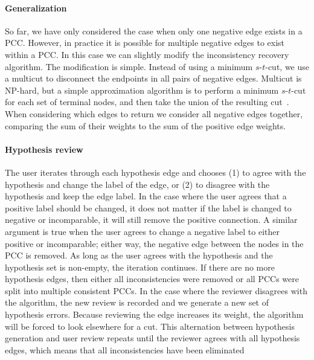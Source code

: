 \paragraph{Generalization}
So far, we have only considered the case when only one negative edge exists in a PCC.
However, in practice it is possible for multiple negative edges to exist within a PCC.
In this case we can slightly modify the inconsistency recovery algorithm.
The modification is simple.
Instead of using a minimum $s$-$t$-cut, we use a multicut to disconnect the endpoints in all pairs of negative
  edges.
Multicut is NP-hard, but a simple approximation algorithm is to perform a minimum $s$-$t$-cut for each set of
  terminal nodes, and then take the union of the resulting cut~\cite[203--208]{vazirani_approximation_2013}.
When considering which edges to return we consider all negative edges together, comparing the sum of their
  weights to the sum of the positive edge weights.

\paragraph{Hypothesis review}
The user iterates through each hypothesis edge and chooses
(1) to agree with the hypothesis and change the label of the edge, or
(2) to disagree with the hypothesis and keep the edge label.
In the case where the user agrees that a positive label should be changed, it does not matter if the label is
  changed to negative or incomparable, it will still remove the positive connection.
A similar argument is true when the user agrees to change a negative label to either positive or incomparable;
  either way, the negative edge between the nodes in the PCC is removed.
As long as the user agrees with the hypothesis and the hypothesis set is non-empty, the iteration continues.
If there are no more hypothesis edges, then either all inconsistencies were removed or all PCCs were split into
  multiple consistent PCCs.
In the case where the reviewer disagrees with the algorithm, the new review is recorded and we generate a new set
  of hypothesis errors.
Because reviewing the edge increases its weight, the algorithm will be forced to look elsewhere for a cut.
This alternation between hypothesis generation and user review repeats until the reviewer agrees with all
  hypothesis edges, which means that all inconsistencies have been eliminated


